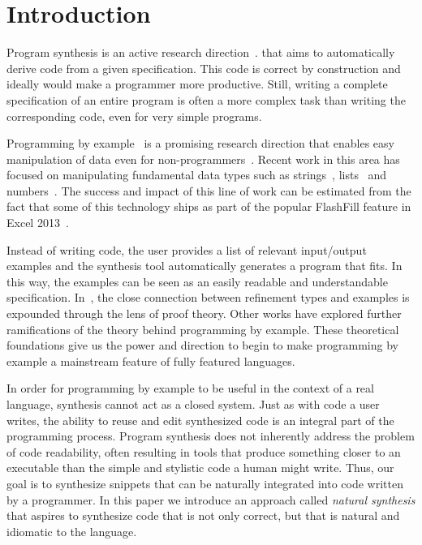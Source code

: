 \section{Introduction} 
\label{intro}

Program synthesis is an active research direction~\cite{DBLP:journals/toplas/MannaW80, DBLP:journals/cacm/GulwaniHS12,DBLP:conf/icfp/Bodik15, DBLP:conf/pldi/KuncakMPS10, DBLP:conf/aplas/Solar-Lezama09, DBLP:conf/pldi/SrivastavaGCF11}. that aims to automatically derive code from a given specification. This code is correct by construction and ideally would make a programmer more productive. Still, writing a complete specification of an entire program is often a more complex task than writing the corresponding code, even for very simple programs.

Programming by example~\cite{cypher93,lieberman01,synasc12} is a promising research direction that enables easy manipulation of data even for non-programmers~\cite{GulwaniHS12}. Recent work in this area has focused on manipulating fundamental data types such as strings~\cite{flashFillPOPL,vldb12,icml13}, lists~\cite{FeserCD15,Osera:2015} and numbers~\cite{cav12}. The success and impact of this line of work can be estimated from the fact that some of this technology ships as part of the popular FlashFill feature in Excel 2013~\cite{flashFillPOPL}.
 
Instead of writing code, the user provides a list of relevant input/output examples and the synthesis tool automatically generates a program that fits. In this way, the examples can be seen as an easily readable and understandable specification. In~\cite{Osera:2016}, the close connection between refinement types and examples is expounded through the lens of proof theory. Other works have explored further ramifications of the theory behind programming by example\cite{Osera:2015, GulwaniHS12, synasc12}. These theoretical foundations give us the power and direction to begin to make programming by example a mainstream feature of fully featured languages.

In order for programming by example to be useful in the context of a real language, synthesis cannot act as a closed system. Just as with code a user writes, the ability to reuse and edit synthesized code is an integral part of the programming process. Program synthesis does not inherently address the problem of code readability, often resulting in tools that produce something closer to an executable than the simple and stylistic code a human might write. Thus, our goal is to synthesize snippets that can be naturally integrated into code written by a programmer. In this paper we introduce an approach called \textit{natural synthesis} that aspires to synthesize code that is not only correct, but that is natural and idiomatic to the language.

